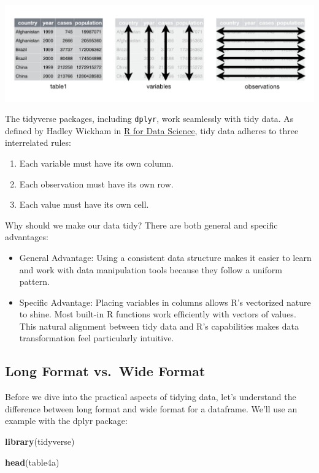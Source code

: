 \documentclass[
]{book}
\newenvironment{Shaded}{\begin{snugshade}}{\end{snugshade}}
\newcommand{\FunctionTok}[1]{\textcolor[rgb]{0.13,0.29,0.53}{\textbf{#1}}}
\newcommand{\NormalTok}[1]{#1}
\begin{document}
\includegraphics{images/tidy-data.png}

The tidyverse packages, including \texttt{dplyr}, work seamlessly with tidy data. As defined by Hadley Wickham in \href{https://r4ds.had.co.nz/}{R for Data Science}, tidy data adheres to three interrelated rules:

\begin{enumerate}
\def\labelenumi{\arabic{enumi}.}
\item
  Each variable must have its own column.
\item
  Each observation must have its own row.
\item
  Each value must have its own cell.
\end{enumerate}

Why should we make our data tidy? There are both general and specific advantages:

\begin{itemize}
\item
  General Advantage: Using a consistent data structure makes it easier to learn and work with data manipulation tools because they follow a uniform pattern.
\item
  Specific Advantage: Placing variables in columns allows R's vectorized nature to shine. Most built-in R functions work efficiently with vectors of values. This natural alignment between tidy data and R's capabilities makes data transformation feel particularly intuitive.
\end{itemize}

\hypertarget{long-format-vs.-wide-format}{%
\subsection{Long Format vs.~Wide Format}\label{long-format-vs.-wide-format}}

Before we dive into the practical aspects of tidying data, let's understand the difference between long format and wide format for a dataframe. We'll use an example with the dplyr package:

\begin{Shaded}
\begin{Highlighting}[]
\FunctionTok{library}\NormalTok{(tidyverse)}

\FunctionTok{head}\NormalTok{(table4a)}
\end{Highlighting}
\end{Shaded}
\end{document}
